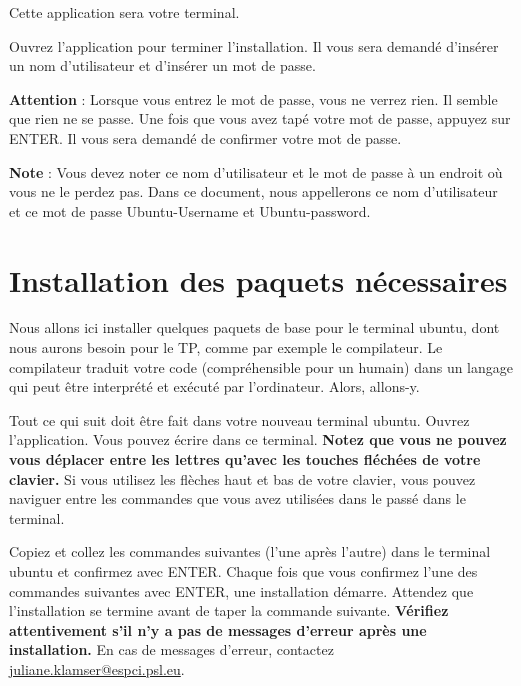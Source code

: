 \documentclass{article}
\begin{document}
Cette application sera votre terminal. 

Ouvrez l'application pour terminer l'installation. 
Il vous sera demandé d'insérer un nom d'utilisateur et d'insérer un mot de passe. 

\textbf{Attention} : Lorsque vous entrez le mot de passe, vous ne verrez rien. Il semble que rien ne se passe. Une fois que vous avez tapé votre mot de passe, appuyez sur ENTER. Il vous sera demandé de confirmer votre mot de passe.

\textbf{Note} : Vous devez noter ce nom d'utilisateur et le mot de passe à un endroit où vous ne le perdez pas. Dans ce document, nous appellerons ce nom d'utilisateur et ce mot de passe Ubuntu-Username et Ubuntu-password.

\section{Installation des paquets nécessaires}
Nous allons ici installer quelques paquets de base pour le terminal ubuntu, dont nous aurons besoin pour le TP, comme par exemple le compilateur. Le compilateur traduit votre code (compréhensible pour un humain) dans un langage qui peut être interprété et exécuté par l'ordinateur. Alors, allons-y.

Tout ce qui suit doit être fait dans votre nouveau terminal ubuntu. Ouvrez l'application. Vous pouvez écrire dans ce terminal. \textbf{Notez que vous ne pouvez vous déplacer entre les lettres qu'avec les touches fléchées de votre clavier. } Si vous utilisez les flèches haut et bas de votre clavier, vous pouvez naviguer entre les commandes que vous avez utilisées dans le passé dans le terminal.

Copiez et collez les commandes suivantes (l'une après l'autre) dans le terminal ubuntu et confirmez avec ENTER. Chaque fois que vous confirmez l'une des commandes suivantes avec ENTER, une installation démarre.  Attendez que l'installation se termine avant de taper la commande suivante. \textbf{Vérifiez attentivement s'il n'y a pas de messages d'erreur après une installation.} En cas de messages d'erreur, contactez \href{mailto:example@example.com}{juliane.klamser@espci.psl.eu}.
\end{document}

